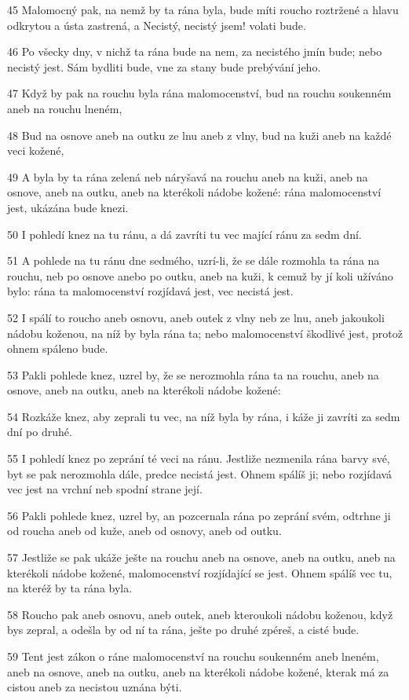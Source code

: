 \par 45 Malomocný pak, na nemž by ta rána byla, bude míti roucho roztržené a hlavu odkrytou a ústa zastrená, a Necistý, necistý jsem! volati bude.
\par 46 Po všecky dny, v nichž ta rána bude na nem, za necistého jmín bude; nebo necistý jest. Sám bydliti bude, vne za stany bude prebývání jeho.
\par 47 Když by pak na rouchu byla rána malomocenství, bud na rouchu soukenném aneb na rouchu lneném,
\par 48 Bud na osnove aneb na outku ze lnu aneb z vlny, bud na kuži aneb na každé veci kožené,
\par 49 A byla by ta rána zelená neb náryšavá na rouchu aneb na kuži, aneb na osnove, aneb na outku, aneb na kterékoli nádobe kožené: rána malomocenství jest, ukázána bude knezi.
\par 50 I pohledí knez na tu ránu, a dá zavríti tu vec mající ránu za sedm dní.
\par 51 A pohlede na tu ránu dne sedmého, uzrí-li, že se dále rozmohla ta rána na rouchu, neb po osnove anebo po outku, aneb na kuži, k cemuž by jí koli užíváno bylo: rána ta malomocenství rozjídavá jest, vec necistá jest.
\par 52 I spálí to roucho aneb osnovu, aneb outek z vlny neb ze lnu, aneb jakoukoli nádobu koženou, na níž by byla rána ta; nebo malomocenství škodlivé jest, protož ohnem spáleno bude.
\par 53 Pakli pohlede knez, uzrel by, že se nerozmohla rána ta na rouchu, aneb na osnove, aneb na outku, aneb na kterékoli nádobe kožené:
\par 54 Rozkáže knez, aby zeprali tu vec, na níž byla by rána, i káže ji zavríti za sedm dní po druhé.
\par 55 I pohledí knez po zeprání té veci na ránu. Jestliže nezmenila rána barvy své, byt se pak nerozmohla dále, predce necistá jest. Ohnem spálíš ji; nebo rozjídavá vec jest na vrchní neb spodní strane její.
\par 56 Pakli pohlede knez, uzrel by, an pozcernala rána po zeprání svém, odtrhne ji od roucha aneb od kuže, aneb od osnovy, aneb od outku.
\par 57 Jestliže se pak ukáže ješte na rouchu aneb na osnove, aneb na outku, aneb na kterékoli nádobe kožené, malomocenství rozjídající se jest. Ohnem spálíš vec tu, na kteréž by ta rána byla.
\par 58 Roucho pak aneb osnovu, aneb outek, aneb kteroukoli nádobu koženou, když bys zepral, a odešla by od ní ta rána, ješte po druhé zpéreš, a cisté bude.
\par 59 Tent jest zákon o ráne malomocenství na rouchu soukenném aneb lneném, aneb na osnove, aneb na outku, aneb na kterékoli nádobe kožené, kterak má za cistou aneb za necistou uznána býti.

